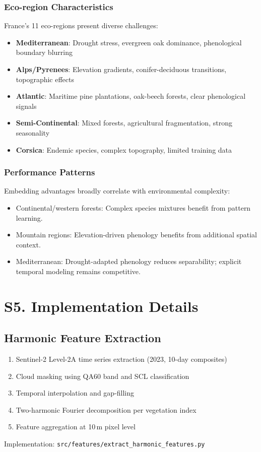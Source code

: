 \documentclass[utf8]{frontiers_suppmat}
\begin{document}
\subsubsection{Eco-region Characteristics}
France's 11 eco-regions present diverse challenges:
\begin{itemize}
    \item \textbf{Mediterranean}: Drought stress, evergreen oak dominance, phenological boundary blurring
    \item \textbf{Alps/Pyrenees}: Elevation gradients, conifer-deciduous transitions, topographic effects
    \item \textbf{Atlantic}: Maritime pine plantations, oak-beech forests, clear phenological signals
    \item \textbf{Semi-Continental}: Mixed forests, agricultural fragmentation, strong seasonality
    \item \textbf{Corsica}: Endemic species, complex topography, limited training data
\end{itemize}

\subsubsection{Performance Patterns}
Embedding advantages broadly correlate with environmental complexity:
\begin{itemize}
    \item Continental/western forests: Complex species mixtures benefit from pattern learning.
    \item Mountain regions: Elevation-driven phenology benefits from additional spatial context.
    \item Mediterranean: Drought-adapted phenology reduces separability; explicit temporal modeling remains competitive.
\end{itemize}

\section{S5. Implementation Details}

\subsection{Harmonic Feature Extraction}
\begin{enumerate}
    \item Sentinel-2 Level-2A time series extraction (2023, 10-day composites)
    \item Cloud masking using QA60 band and SCL classification
    \item Temporal interpolation and gap-filling
    \item Two-harmonic Fourier decomposition per vegetation index
    \item Feature aggregation at 10\,m pixel level
\end{enumerate}
Implementation: \texttt{src/features/extract\_harmonic\_features.py}
\end{document}
